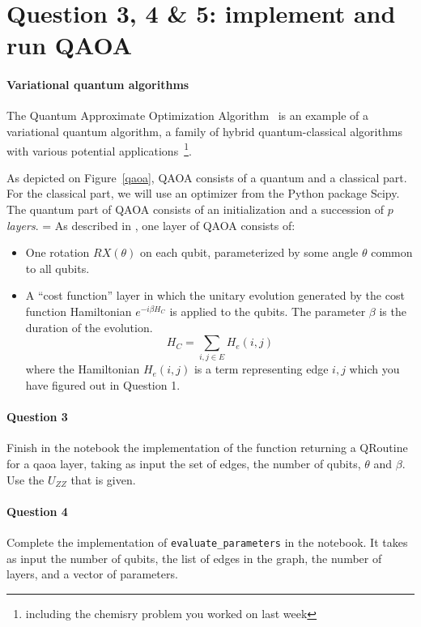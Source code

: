 \documentclass{article}
\begin{document}
\section{Question 3, 4 \& 5: implement and run QAOA}

\paragraph{Variational quantum algorithms} The Quantum Approximate Optimization Algorithm~\cite{farhi2014quantum} is 
an example of a variational quantum algorithm, a family of hybrid quantum-classical algorithms with various potential
applications~\cite{cerezo2021variational}\footnote{including the chemisry problem you worked on last week}.

As depicted on Figure~\ref{qaoa}, QAOA consists of a quantum and a classical part. For the classical part, we will
use an optimizer from the Python package Scipy. The quantum part of QAOA consists of an initialization and a succession of $p$ \emph{layers}.
=
As described in \cite{farhi2014quantum}, one layer of QAOA consists of:
\begin{itemize}
    \item[1.] One rotation $RX(\theta)$ on each qubit, parameterized 
    by some angle $\theta$ common to all qubits. 
    \item[2.] A ``cost function'' layer in which the unitary evolution generated
    by the cost function Hamiltonian $e^{-i\beta H_{C}}$ is applied to the qubits. The parameter
    $\beta$ is the duration of the evolution.
    $$H_C = \sum_{i,j\in E} H_e(i,j)$$
    where the Hamiltonian $H_e(i,j)$ is a term representing edge $i,j$ which you have figured out in Question 1.
\end{itemize}

\paragraph{Question 3} Finish in the notebook the implementation of the function returning a QRoutine
for a qaoa layer, taking as input the set of edges, the number of qubits, $\theta$ and $\beta$. Use the $U_{ZZ}$ that is given.

\paragraph{Question 4} Complete the implementation of {\tt evaluate\_parameters} in the notebook. It takes as
input the number of qubits, the list of edges in the graph, the number of layers, and a vector of parameters.
\end{document}
